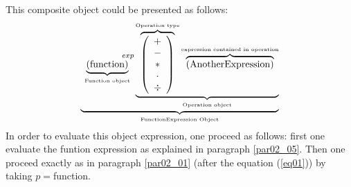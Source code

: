 \documentclass[11pt]{amsart}
\begin{document}
This composite object could be presented as follows:
\begin{equation}
 \underbrace{    \underbrace{ \left(\mbox{function}\right) }_{\mbox{\tiny Function object}} ^{\hspace{15mm}exp} \underbrace{  \overbrace{\left( \begin{array}{c} + \\ - \\ \ast  \\ \cdot \\ \div   \end{array} \right) }^{\mbox{\tiny Operation type}}
 \overbrace{    \left( \mbox{AnotherExpression}\right) }^{\mbox{\tiny expression contained in operation}}   }_{\mbox{\tiny Operation object}}}_{\mbox{\tiny FunctionExpression Object}}
\end{equation}
In order to evaluate this object expression, one proceed as follows: first one evaluate the funtion expression as explained in paragraph  \ref{par02_05}. Then one proceed exactly as in paragraph \ref{par02_01} (after the equation (\ref{eq01})) by taking $p=$function.
\end{document}
